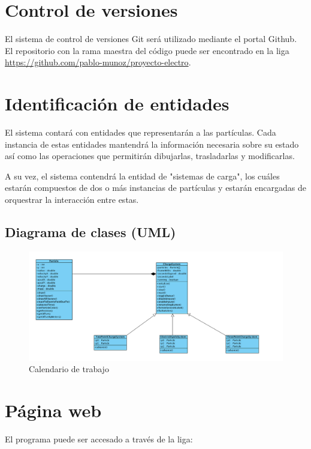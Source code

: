 \documentclass[11pt]{article}
\begin{document}
\section{Control de versiones}
\label{sec-4}
El sistema de control de versiones Git será utilizado mediante el
portal Github. El repositorio con la rama maestra del código puede ser
encontrado en la liga \url{https://github.com/pablo-munoz/proyecto-electro}.

\section{Identificación de entidades}
\label{sec-5}
El sistema contará con entidades que representarán a las
partículas. Cada instancia de estas entidades mantendrá la información
necesaria sobre su estado así como las operaciones que permitirán
dibujarlas, trasladarlas y modificarlas.

A su vez, el sistema contendrá la entidad de "sistemas de carga", los
cuáles estarán compuestos de dos o más instancias de partículas y
estarán encargadas de orquestrar la interacción entre estas.


\begin{landscape}
  \section{Diagrama de clases (UML)}
  \begin{figure}[H]
    \centering
    \includegraphics[width=.9\linewidth]{classes-uml.png}
    \caption{Calendario de trabajo}
    \label{fig:calendar}
  \end{figure}
\end{landscape}
\restoregeometry %

\section{Página web}
\label{sec-6}
El programa puede ser accesado a través de la liga:
\end{document}
